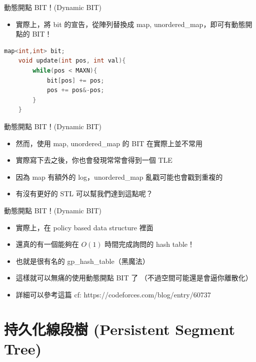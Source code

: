 \documentclass[aspectratio=169]{beamer}
\begin{document}
    \begin{frame}[fragile]{動態開點 BIT！(Dynamic BIT)}
        \begin{itemize}
            \item 實際上，將 bit 的宣告，從陣列替換成 map, unordered\_map，即可有動態開點的 BIT！
        \end{itemize}
        \begin{lstlisting}[language=C++,basicstyle=\ttfamily \small]
    map<int,int> bit;
    void update(int pos, int val){
        while(pos < MAXN){
            bit[pos] += pos;
            pos += pos&-pos;
        }
    }
        \end{lstlisting}
    \end{frame}

    \begin{frame}[fragile]{動態開點 BIT！(Dynamic BIT)}
        \begin{itemize}
            \item 然而，使用 map, unordered\_map 的 BIT 在實際上並不常用
            \item 實際寫下去之後，你也會發現常常會得到一個 TLE
            \item 因為 map 有額外的 log，unordered\_map 亂戳可能也會戳到重複的
            \item<2-> 有沒有更好的 STL 可以幫我們達到這點呢？
        \end{itemize}
    \end{frame}

    \begin{frame}[fragile]{動態開點 BIT！(Dynamic BIT)}
        \begin{itemize}
            \item 實際上，在 policy based data structure 裡面
            \item 還真的有一個能夠在 $O(1)$ 時間完成詢問的 hash table！
            \item 也就是很有名的 gp\_hash\_table（黑魔法）
            \item 這樣就可以無痛的使用動態開點 BIT 了 （不過空間可能還是會逼你離散化）
            \item 詳細可以參考這篇 cf: https://codeforces.com/blog/entry/60737
        \end{itemize}
    \end{frame}

    \section{持久化線段樹 (Persistent Segment Tree)}
\end{document}
